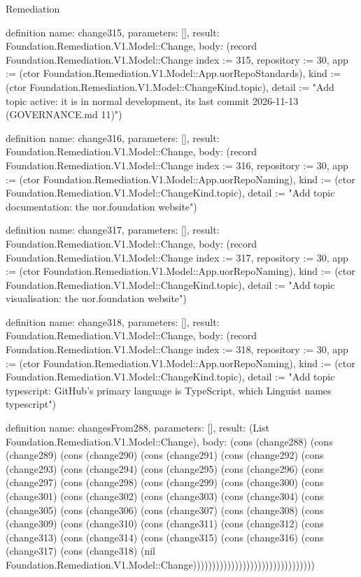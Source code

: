 \begin{lexlean}{Remediation}
\begin{semanticmodule}
definition{
  name: change315,
  parameters: [],
  result: Foundation.Remediation.V1.Model::Change,
  body: (record Foundation.Remediation.V1.Model::Change {index := 315, repository := 30, app := (ctor Foundation.Remediation.V1.Model::App.uorRepoStandards), kind := (ctor Foundation.Remediation.V1.Model::ChangeKind.topic), detail := "Add topic active: it is in normal development, its last commit 2026-11-13 (GOVERNANCE.md 11)"})
}

definition{
  name: change316,
  parameters: [],
  result: Foundation.Remediation.V1.Model::Change,
  body: (record Foundation.Remediation.V1.Model::Change {index := 316, repository := 30, app := (ctor Foundation.Remediation.V1.Model::App.uorRepoNaming), kind := (ctor Foundation.Remediation.V1.Model::ChangeKind.topic), detail := "Add topic documentation: the uor.foundation website"})
}

definition{
  name: change317,
  parameters: [],
  result: Foundation.Remediation.V1.Model::Change,
  body: (record Foundation.Remediation.V1.Model::Change {index := 317, repository := 30, app := (ctor Foundation.Remediation.V1.Model::App.uorRepoNaming), kind := (ctor Foundation.Remediation.V1.Model::ChangeKind.topic), detail := "Add topic visualisation: the uor.foundation website"})
}

definition{
  name: change318,
  parameters: [],
  result: Foundation.Remediation.V1.Model::Change,
  body: (record Foundation.Remediation.V1.Model::Change {index := 318, repository := 30, app := (ctor Foundation.Remediation.V1.Model::App.uorRepoNaming), kind := (ctor Foundation.Remediation.V1.Model::ChangeKind.topic), detail := "Add topic typescript: GitHub's primary language is TypeScript, which Linguist names typescript"})
}

definition{
  name: changesFrom288,
  parameters: [],
  result: (List Foundation.Remediation.V1.Model::Change),
  body: (cons (change288) (cons (change289) (cons (change290) (cons (change291) (cons (change292) (cons (change293) (cons (change294) (cons (change295) (cons (change296) (cons (change297) (cons (change298) (cons (change299) (cons (change300) (cons (change301) (cons (change302) (cons (change303) (cons (change304) (cons (change305) (cons (change306) (cons (change307) (cons (change308) (cons (change309) (cons (change310) (cons (change311) (cons (change312) (cons (change313) (cons (change314) (cons (change315) (cons (change316) (cons (change317) (cons (change318) (nil Foundation.Remediation.V1.Model::Change))))))))))))))))))))))))))))))))
}


\end{semanticmodule}
\end{lexlean}
